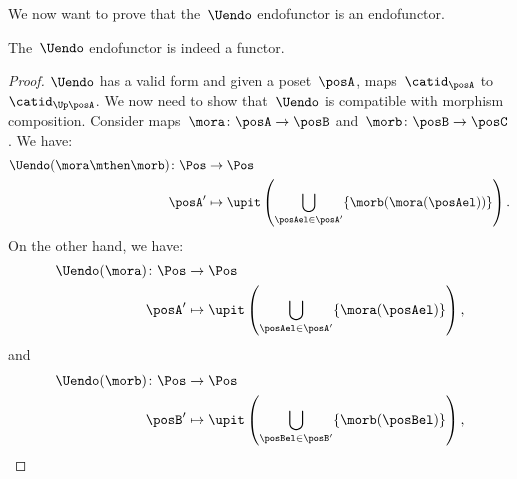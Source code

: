 We now want to prove that the~$\Uendo$ endofunctor is an endofunctor.

\begin{lemma}
    \label{lem:Uendo-is-functor}
    The~$\Uendo$ endofunctor is indeed a functor.
\end{lemma}

\begin{proof}
    $\Uendo$ has a valid form and given a poset~$\posA$, maps~$\catid_\posA$ to~$\catid_{\Up \posA}$.
    We now need to show that~$\Uendo$ is compatible with morphism composition.
    Consider maps~$\mora\colon \posA \to \posB$ and~$\morb\colon \posB \to \posC$.
    We have:
    \begin{equation}
        \label{eq:ufunctor_1}
        \begin{aligned}
            \Uendo(\mora\mthen \morb)\colon \Pos & \to \Pos                                                                           \\
            \posA'                               & \mapsto \upit \left( \bigcup_{\posAel\in \posA'} \{\morb(\mora(\posAel))\}\right).
        \end{aligned}
    \end{equation}
    On the other hand, we have:
    \begin{equation}
        \begin{aligned}
            \Uendo(\mora)\colon \Pos & \to \Pos                                                                   \\
            \posA'                   & \mapsto \upit \left( \bigcup_{\posAel\in \posA'}\{\mora(\posAel)\}\right),
        \end{aligned}
    \end{equation}
    and
    \begin{equation}
        \begin{aligned}
            \Uendo(\morb)\colon \Pos & \to \Pos                                                                   \\
            \posB'                   & \mapsto \upit \left( \bigcup_{\posBel\in \posB'}\{\morb(\posBel)\}\right),
        \end{aligned}
    \end{equation}

\end{proof}
